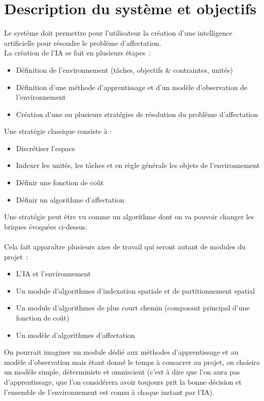 \section{Description du système et objectifs}

Le système doit permettre pour l'utilisateur la création d'une intelligence artificielle pour résoudre le problème d'affectation.\\
La création de l'IA se fait en plusieurs étapes :
\begin{itemize}
\item Définition de l'environnement (tâches, objectifs & contraintes, unités)
\item Définition d'une méthode d'apprentissage et d'un modèle d'observation de l'environnement
\item Création d'une ou plusieurs stratégies de résolution du problème d'affectation
\end{itemize}

Une stratégie classique consiste à :
\begin{itemize}
\item Discrétiser l'espace
\item Indexer les unités, les tâches et en règle générale les objets de l'environnement
\item Définir une fonction de coût
\item Définir un algorithme d'affectation
\end{itemize}

Une stratégie peut être vu comme un algorithme dont on va pouvoir changer les briques évoquées ci-dessus.\\\\

Cela fait apparaître plusieurs axes de travail qui seront autant de modules du projet :
\begin{itemize}
\item L'IA et l'environnement
\item Un module d'algorithmes d'indexation spatiale et  de partitionnement spatial
\item Un module d'algorithmes de plus court chemin (composant principal d'une fonction de coût)
\item Un modèle d'algorithmes d'affectation
\end{itemize}

On pourrait imaginer un module dédié aux méthodes d'apprentissage et au modèle d'observation mais étant donné le temps à consacrer au projet, on choisira un modèle simple, déterministe et omniscient (c'est à dire que l'on aura pas d'apprentissage, que l'on considérera avoir toujours prit la bonne décision et l'ensemble de l'environnement est connu à chaque instant par l'IA).

